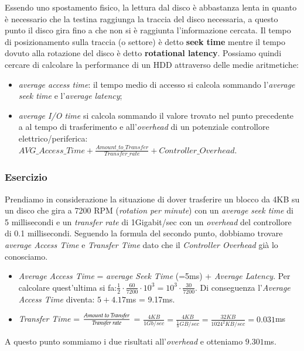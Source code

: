 Essendo uno spostamento fisico, la lettura dal disco è abbastanza lenta in quanto è necessario che la testina raggiunga la traccia del disco necessaria, a questo punto il disco gira fino a che non si è raggiunta l'informazione cercata. Il tempo di posizionamento sulla traccia (o settore) è detto \textbf{seek time} mentre il tempo dovuto alla rotazione del disco è detto \textbf{rotational latency}. Possiamo quindi cercare di calcolare la performance di un HDD attraverso delle medie aritmetiche:
\vspace{-5px}
\begin{itemize}
\setlength{\itemsep}{-.15 em}
    \item \textit{average access time}: il tempo medio di accesso si calcola sommando l'\textit{average seek time} e l'\textit{average latency};
    \item \textit{average I/O time} si calcola sommando il valore trovato nel punto precedente a al tempo di trasferimento e all'\textit{overhead} di un potenziale controllore elettrico/periferica: $AVG\_Access\_Time + \frac{Amount\_to\_Transfer}{Transfer\_rate} + Controller\_Overhead$.
\end{itemize}

% 
\subsubsection*{Esercizio}
Prendiamo in considerazione la situazione di dover trasferire un blocco da 4KB su un disco che gira a 7200 RPM (\textit{rotation per minute}) con un \textit{average seek time} di 5 millisecondi e un \textit{transfer rate} di 1Gigabit/sec con un \textit{overhead} del controllore di 0.1 millisecondi. Seguendo la formula del secondo punto, dobbiamo trovare \textit{average Access Time} e \textit{Transfer Time} dato che il \textit{Controller Overhead} già lo conosciamo.
\begin{itemize}
\setlength{\itemsep}{-.15 em}
    \item \textit{Average Access Time} = \textit{average Seek Time} (=5ms) + \textit{Average Latency}. Per calcolare quest'ultima si fa:$\frac{1}{2}\cdot\frac{60}{7200}\cdot10^3 = 10^3 \cdot \frac{30}{7200}$. Di conseguenza l'\textit{Average Access Time} diventa: $5 + 4.17$ms = 9.17ms.
    \item \textit{Transfer Time} = $\frac{\text{\textit{Amount to Transfer}}}{\text{\textit{Transfer rate}}}$ = $\frac{4KB}{1 Gb/sec} = \frac{4KB}{\frac{1}{8}GB/sec} = \frac{32KB}{1024^2 KB/sec} = 0.031$ms
\end{itemize}
A questo punto sommiamo i due risultati all'\textit{overhead} e otteniamo $9.301$ms.

